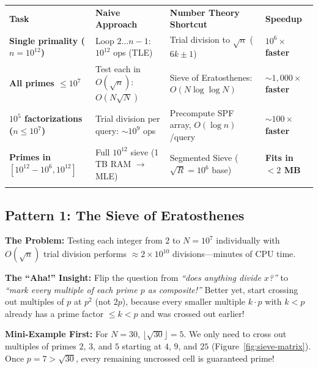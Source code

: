 \documentclass[11pt,a4paper]{article}
\theoremstyle{definition}
\newcommand{\painbeat}{\textbf{\color{accentamber}The Problem:} }
\newcommand{\ahabeat}{\textbf{\color{accentteal}The ``Aha!'' Insight:} }
\newcommand{\examplebeat}{\textbf{\color{primaryblue}Mini-Example First:} }
\begin{document}
\begingroup\small{}
\begin{tabularx}{\textwidth}{>{\raggedright\arraybackslash\bfseries}p{3.8cm} >{\raggedright\arraybackslash}p{4.3cm} >{\raggedright\arraybackslash}p{4.1cm} >{\raggedright\arraybackslash\bfseries}X}
\arrayrulecolor{primaryblue}\toprule[1.2pt]
\rowcolor{primaryblue!10}
\textcolor{primaryblue}{\textbf{Task}} & \textcolor{primaryblue}{\textbf{Naive Approach}} & \textcolor{primaryblue}{\textbf{Number Theory Shortcut}} & \textcolor{primaryblue}{\textbf{Speedup}} \\
\arrayrulecolor{codeframe}\midrule[0.6pt]
Single primality ($n = 10^{12}$) & Loop $2 \dots n-1$: $10^{12}$ ops (TLE) & Trial division to $\sqrt{n}$ ($6k \pm 1$) & $10^6\times$ faster \\
All primes $\le 10^7$ & Test each in $O(\sqrt{n})$: $O(N\sqrt{N})$ & Sieve of Eratosthenes: $O(N\log\log N)$ & $\sim 1{,}000\times$ faster \\
$10^5$ factorizations ($n \le 10^7$) & Trial division per query: $\sim 10^9$ ops & Precompute SPF array, $O(\log n)$/query & $\sim 100\times$ faster \\
Primes in $[10^{12} - 10^6, 10^{12}]$ & Full $10^{12}$ sieve (1 TB RAM $\to$ MLE) & Segmented Sieve ($\sqrt{R} = 10^6$ base) & Fits in $< 2$ MB \\
\arrayrulecolor{primaryblue}\bottomrule[1.2pt]
\end{tabularx}\endgroup

\subsection{Pattern 1: The Sieve of Eratosthenes}

\painbeat Testing each integer from $2$ to $N = 10^7$ individually with $O(\sqrt{n})$ trial division performs $\approx 2 \times 10^{10}$ divisions---minutes of CPU time.

\ahabeat Flip the question from \emph{``does anything divide $x$?''} to \emph{``mark every multiple of each prime $p$ as composite!''} Better yet, start crossing out multiples of $p$ at $p^2$ (not $2p$), because every smaller multiple $k \cdot p$ with $k < p$ already has a prime factor $\le k < p$ and was crossed out earlier!

\examplebeat For $N = 30$, $\lfloor\sqrt{30}\rfloor = 5$. We only need to cross out multiples of primes $2$, $3$, and $5$ starting at $4$, $9$, and $25$ (Figure~\ref{fig:sieve-matrix}). Once $p = 7 > \sqrt{30}$, every remaining uncrossed cell is guaranteed prime!
\end{document}
